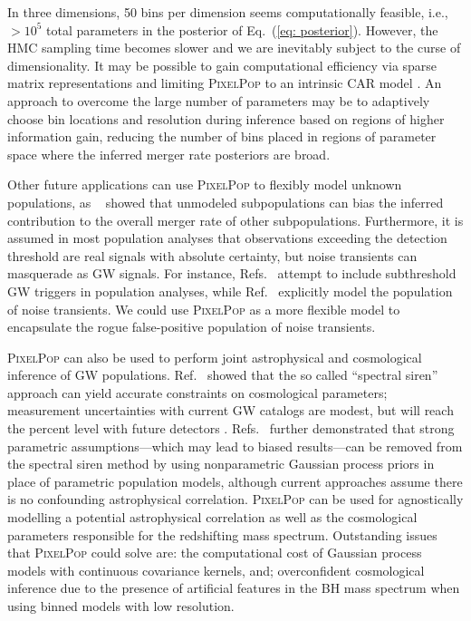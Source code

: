 \begin{refsection}
In three dimensions, 50 bins per dimension seems computationally feasible, i.e., $>10^5$ total parameters in the posterior of Eq.~(\ref{eq: posterior}). However, the HMC sampling time becomes slower and we are inevitably subject to the curse of dimensionality. It may be possible to gain computational efficiency via sparse matrix representations and limiting \textsc{PixelPop} to an intrinsic CAR model \cite{MORRIS2019100301}. An approach to overcome the large number of parameters may be to adaptively choose bin locations and resolution during inference based on regions of higher information gain, reducing the number of bins placed in regions of parameter space where the inferred merger rate posteriors are broad.

Other future applications can use \textsc{PixelPop} to flexibly model unknown populations, as \citeauthor{Cheng:2023ddt}~\cite{Cheng:2023ddt} showed that unmodeled subpopulations can bias the inferred contribution to the overall merger rate of other subpopulations. Furthermore, it is assumed in most population analyses that observations exceeding the detection threshold are real signals with absolute certainty, but noise transients can masquerade as GW signals. For instance, Refs.~\cite{Gaebel:2018poe, Roulet:2020wyq, Galaudage:2019jdx} attempt to include subthreshold GW triggers in population analyses, while Ref.~\cite{Heinzel:2023vkq} explicitly model the population of noise transients. We could use \textsc{PixelPop} as a more flexible model to encapsulate the rogue false-positive population of noise transients.

\textsc{PixelPop} can also be used to perform joint astrophysical and cosmological inference of GW populations. Ref.~\cite{Ezquiaga:2022zkx} showed that the so called ``spectral siren'' approach can yield accurate constraints on cosmological parameters; measurement uncertainties with current GW catalogs are modest, but will reach the percent level with future detectors \cite{Chen:2024gdn}. Refs.~\cite{Farah:2024xub, MaganaHernandez:2024uty} further demonstrated that strong parametric assumptions---which may lead to biased results---can be removed from the spectral siren method by using nonparametric Gaussian process priors in place of parametric population models, although current approaches assume there is no confounding astrophysical correlation. \textsc{PixelPop} can be used for agnostically modelling a potential astrophysical correlation as well as the cosmological parameters responsible for the redshifting mass spectrum. Outstanding issues that \textsc{PixelPop} could solve are: the computational cost of Gaussian process models with continuous covariance kernels, and; overconfident cosmological inference due to the presence of artificial features in the BH mass spectrum when using binned models with low resolution.


\end{refsection}
